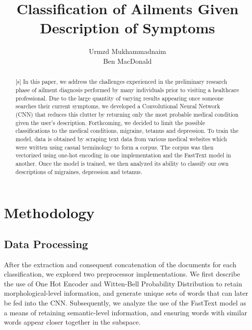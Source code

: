 \documentclass[12pt]{report}
\title{Classification of Ailments Given Description of Symptoms}
\author{Urmzd Mukhammadnaim \\ Ben MacDonald}
\begin{document}
\maketitle
\tableofcontents
\begin{abstract}[s] 
In this paper, we address the challenges experienced in the preliminary research phase
of ailment diagnosis performed by many individuals prior to visiting a
healthcare professional. Due to the large quantity of varying results appearing
once someone searches their current symptoms, we developed a Convolutional
Neural Network (CNN) that reduces this clutter by returning only the most
probable medical condition given the user’s description. Forthcoming, we
decided to limit the possible classifications to the medical conditions,
migraine, tetanus and depression. To train the model, data is obtained by
scraping text data from various medical websites which were written using
casual terminology to form a corpus. The corpus was then vectorized using
one-hot encoding in one implementation and the FastText model in another. Once
the model is trained, we then analyzed its ability to classify our own
descriptions of migraines, depression and tetanus. \end{abstract}

\chapter{Methodology} 
\section{Data Processing}

After the extraction and consequent concatenation of the documents for each
classification, we explored two preprocessor implementations. We first describe
the use of One Hot Encoder and Witten-Bell Probability Distribution to retain
morphological-level information, and generate unique sets of words that can
later be fed into the CNN. Subsequently, we analyze the use of the FastText
model as a means of retaining semantic-level information, and ensuring words
with similar words appear closer together in the subspace.
\end{document}
